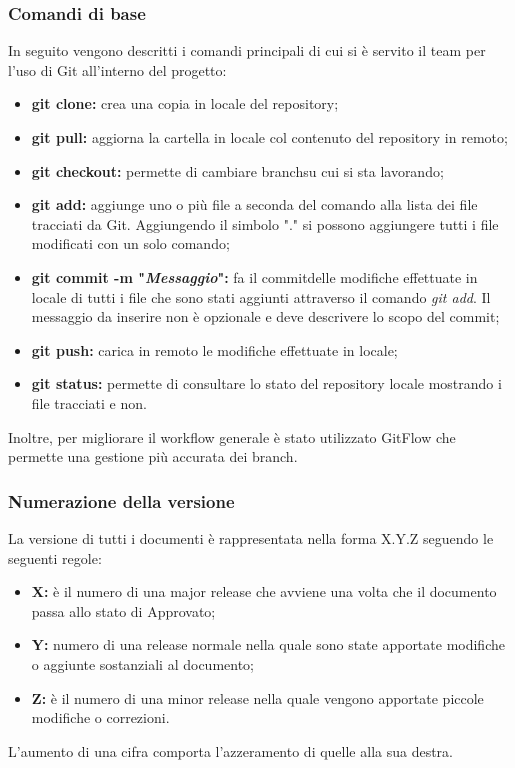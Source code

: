 		\subsubsection{Comandi di base}
			In seguito vengono descritti i comandi principali di cui si è servito il team per l'uso di Git all'interno del progetto:
			\begin{itemize}
				\item \textbf{git clone:} crea una copia in locale del repository\pedice;
				\item \textbf{git pull:} aggiorna la cartella in locale col contenuto del repository in remoto;
				\item \textbf{git checkout:} permette di cambiare branch\pedice su cui si sta lavorando;
				\item \textbf{git add:} aggiunge uno o più file a seconda del comando alla lista dei file tracciati da Git. Aggiungendo il simbolo "." si possono aggiungere tutti i file modificati con un solo comando;
				\item \textbf{git commit -m "\textit{Messaggio}":} fa il commit\pedice delle modifiche effettuate in locale di tutti i file che sono stati aggiunti attraverso il comando \textit{git add}. Il messaggio da inserire non è opzionale e deve descrivere lo scopo del commit;
				\item \textbf{git push:} carica in remoto le modifiche effettuate in locale;
				\item \textbf{git status:} permette di consultare  lo stato del repository locale mostrando i file tracciati e non. \newline
			\end{itemize}
			Inoltre, per migliorare il workflow generale è stato utilizzato GitFlow che permette una gestione più accurata dei branch.
		\subsubsection{Numerazione della versione}
		\label{3.2.2}
			La versione di tutti i documenti è rappresentata nella forma X.Y.Z seguendo le seguenti regole:
			\begin{itemize}
				\item \textbf{X:} è il numero di una major release che avviene una volta che il documento passa allo stato di Approvato;
				\item \textbf{Y:} numero di una release normale nella quale sono state apportate modifiche o aggiunte sostanziali al documento;
				\item \textbf{Z:} è il numero di una minor release nella quale vengono apportate piccole modifiche o correzioni.
			\end{itemize}
		L'aumento di una cifra comporta l'azzeramento di quelle alla sua destra. \newline
		
